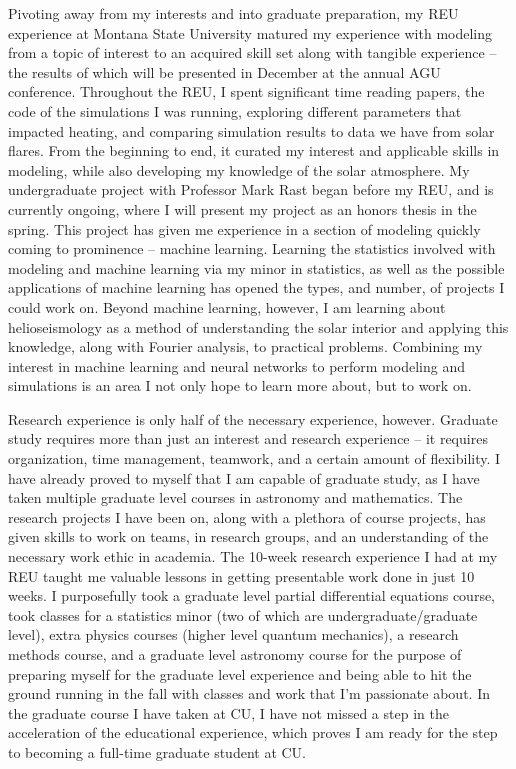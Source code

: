 \documentclass[11pt,letterpaper]{article}
\begin{document}
Pivoting away from my interests and into graduate preparation, my REU experience at Montana State University matured my experience with modeling from a topic of interest to an acquired skill set along with tangible experience – the results of which will be presented in December at the annual AGU conference. Throughout the REU, I spent significant time reading papers, the code of the simulations I was running, exploring different parameters that impacted heating, and comparing simulation results to data we have from solar flares. From the beginning to end, it curated my interest and applicable skills in modeling, while also developing my knowledge of the solar atmosphere. My undergraduate project with Professor Mark Rast began before my REU, and is currently ongoing, where I will present my project as an honors thesis in the spring. This project has given me experience in a section of modeling quickly coming to prominence -- machine learning. Learning the statistics involved with modeling and machine learning via my minor in statistics, as well as the possible applications of machine learning has opened the types, and number, of projects I could work on. Beyond machine learning, however, I am learning about helioseismology as a method of understanding the solar interior and applying this knowledge, along with Fourier analysis, to practical problems. Combining my interest in machine learning and neural networks to perform modeling and simulations is an area I not only hope to learn more about, but to work on.
   
Research experience is only half of the necessary experience, however. Graduate study requires more than just an interest and research experience -- it requires organization, time management, teamwork, and a certain amount of flexibility. I have already proved to myself that I am capable of graduate study, as I have taken multiple graduate level courses in astronomy and mathematics. The research projects I have been on, along with a plethora of course projects, has given skills to work on teams, in research groups, and an understanding of the necessary work ethic in academia. The 10-week research experience I had at my REU taught me valuable lessons in getting presentable work done in just 10 weeks. I purposefully took a graduate level partial differential equations course, took classes for a statistics minor (two of which are undergraduate/graduate level), extra physics courses (higher level quantum mechanics), a research methods course, and a graduate level astronomy course for the purpose of preparing myself for the graduate level experience and being able to hit the ground running in the fall with classes and work that I’m passionate about. In the graduate course I have taken at CU, I have not missed a step in the acceleration of the educational experience, which proves I am ready for the step to becoming a full-time graduate student at CU.
  
\end{document}
